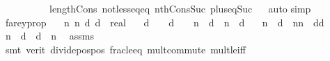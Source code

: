 \begin{isabellebody}
\ \ \ \ \ \ \ \ \ \ length{\isacharunderscore}{\kern0pt}Cons\ not{\isacharunderscore}{\kern0pt}less{\isacharunderscore}{\kern0pt}eq{\isacharunderscore}{\kern0pt}eq\ nth{\isacharunderscore}{\kern0pt}Cons{\isacharunderscore}{\kern0pt}Suc\ plus{\isacharunderscore}{\kern0pt}{}{\isacharunderscore}{\kern0pt}eq{\isacharunderscore}{\kern0pt}Suc{\isacharparenright}{\kern0pt}\isanewline
\ \ \isamarkupfalse%
{\isacharparenleft}{\kern0pt}auto{\isacharparenright}{\kern0pt}\isanewline
{}\isamarkupfalse%
{\isacharparenleft}{\kern0pt}simp{\isacharparenright}{\kern0pt}%
\endisatagproof
{\isafoldproof}%
%
\isadelimproof
\isanewline
%
\endisadelimproof
\isanewline
{}\isamarkupfalse%
\ farey{\isacharunderscore}{\kern0pt}prop{}{\isacharcolon}{\kern0pt}\isanewline
\ \ \ n{}\ n{}\ d{}\ d{}\ {\isacharcolon}{\kern0pt}{\isacharcolon}{\kern0pt}\ real\isanewline
\ \ \ {\isachardoublequoteopen}d{}\ {\isachargreater}{\kern0pt}\ {}{\isachardoublequoteclose}\ \ {\isachardoublequoteopen}d{}\ {\isachargreater}{\kern0pt}\ {}{\isachardoublequoteclose}\ \ {\isachardoublequoteopen}n{}\ {\isacharslash}{\kern0pt}\ d{}\ {\isacharless}{\kern0pt}\ n{}\ {\isacharslash}{\kern0pt}\ d{}{\isachardoublequoteclose}\isanewline
\ \ \ {\isachardoublequoteopen}n{}\ {\isacharslash}{\kern0pt}\ d{}\ {\isacharless}{\kern0pt}\ {\isacharparenleft}{\kern0pt}n{}{\isacharplus}{\kern0pt}n{}{\isacharparenright}{\kern0pt}\ {\isacharslash}{\kern0pt}\ {\isacharparenleft}{\kern0pt}d{}{\isacharplus}{\kern0pt}d{}{\isacharparenright}{\kern0pt}{\isachardoublequoteclose}\isanewline
%
\isadelimproof
%
\endisadelimproof
%
\isatagproof
{}\isamarkupfalse%
{\isacharminus}{\kern0pt}\isanewline
\ \ \isamarkupfalse%
\ {\isachardoublequoteopen}n{}\ {\isacharasterisk}{\kern0pt}\ d{}\ {\isacharless}{\kern0pt}\ d{}\ {\isacharasterisk}{\kern0pt}\ n{}{\isachardoublequoteclose}\ \isamarkupfalse%
\ assms\isanewline
\ \ \ \ \isamarkupfalse%
\ {\isacharparenleft}{\kern0pt}smt\ {\isacharparenleft}{\kern0pt}verit{\isacharparenright}{\kern0pt}\ divide{\isacharunderscore}{\kern0pt}pos{\isacharunderscore}{\kern0pt}pos\ frac{\isacharunderscore}{\kern0pt}le{\isacharunderscore}{\kern0pt}eq\ mult{\isachardot}{\kern0pt}commute\ mult{\isacharunderscore}{\kern0pt}le{\isacharunderscore}{\kern0pt}{}{\isacharunderscore}{\kern0pt}iff{\isacharparenright}{\kern0pt}\isanewline

\end{isabellebody}
